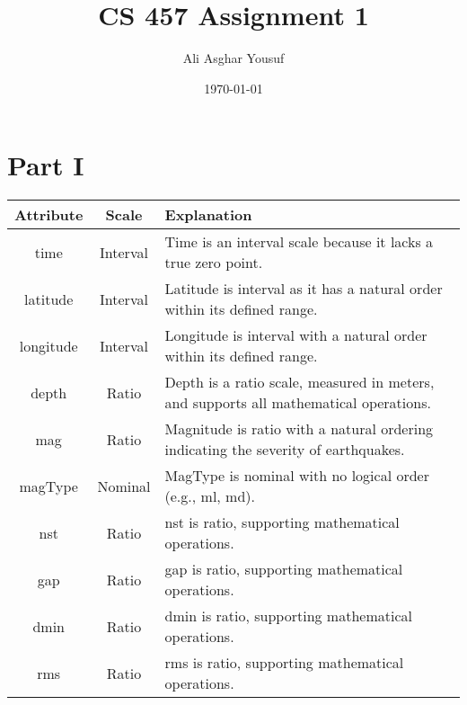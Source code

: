 \documentclass{article}
\title{CS 457 Assignment 1}
\author{Ali Asghar Yousuf}
\date{\today}
\begin{document}
\setcounter{page}{1}

{} %


\maketitle

\section*{Part I}
\begin{tabular}{|c|c|p{11cm}|}
    \hline
    \textbf{Attribute} & \textbf{Scale} & \textbf{Explanation}                                                                  \\
    \hline
    time               & Interval       & Time is an interval scale because it lacks a true zero point.                         \\
    \hline
    latitude           & Interval       & Latitude is interval as it has a natural order within its defined range.              \\
    \hline
    longitude          & Interval       & Longitude is interval with a natural order within its defined range.                  \\
    \hline
    depth              & Ratio          & Depth is a ratio scale, measured in meters, and supports all mathematical operations. \\
    \hline
    mag                & Ratio          & Magnitude is ratio with a natural ordering indicating the severity of earthquakes.    \\
    \hline
    magType            & Nominal        & MagType is nominal with no logical order (e.g., ml, md).                              \\
    \hline
    nst                & Ratio          & nst is ratio, supporting mathematical operations.                                     \\
    \hline
    gap                & Ratio          & gap is ratio, supporting mathematical operations.                                     \\
    \hline
    dmin               & Ratio          & dmin is ratio, supporting mathematical operations.                                    \\
    \hline
    rms                & Ratio          & rms is ratio, supporting mathematical operations.                                     \\

\end{tabular}
\end{document}
